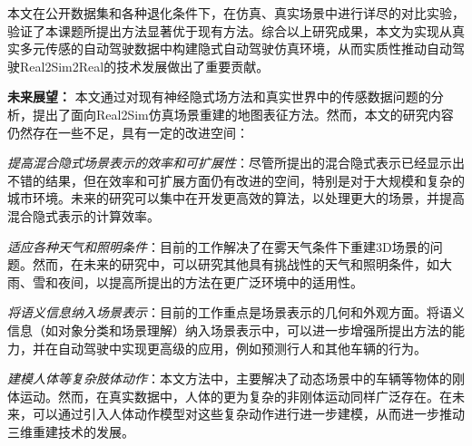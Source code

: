 \begin{conclusion}
本文在公开数据集和各种退化条件下，在仿真、真实场景中进行详尽的对比实验，验证了本课题所提出方法显著优于现有方法。综合以上研究成果，本文为实现从真实多元传感的自动驾驶数据中构建隐式自动驾驶仿真环境，从而实质性推动自动驾驶Real2Sim2Real的技术发展做出了重要贡献。

\clearpage
\textbf{未来展望：}
本文通过对现有神经隐式场方法和真实世界中的传感数据问题的分析，提出了面向Real2Sim仿真场景重建的地图表征方法。然而，本文的研究内容仍然存在一些不足，具有一定的改进空间：

\textit{提高混合隐式场景表示的效率和可扩展性}：尽管所提出的混合隐式表示已经显示出不错的结果，但在效率和可扩展方面仍有改进的空间，特别是对于大规模和复杂的城市环境。未来的研究可以集中在开发更高效的算法，以处理更大的场景，并提高混合隐式表示的计算效率。

\textit{适应各种天气和照明条件}：目前的工作解决了在雾天气条件下重建3D场景的问题。然而，在未来的研究中，可以研究其他具有挑战性的天气和照明条件，如大雨、雪和夜间，以提高所提出的方法在更广泛环境中的适用性。

\textit{将语义信息纳入场景表示}：目前的工作重点是场景表示的几何和外观方面。将语义信息（如对象分类和场景理解）纳入场景表示中，可以进一步增强所提出方法的能力，并在自动驾驶中实现更高级的应用，例如预测行人和其他车辆的行为。

\textit{建模人体等复杂肢体动作}：本文方法中，主要解决了动态场景中的车辆等物体的刚体运动。然而，在真实数据中，人体的更为复杂的非刚体运动同样广泛存在。在未来，可以通过引入人体动作模型对这些复杂动作进行进一步建模，从而进一步推动三维重建技术的发展。


\end{conclusion}

